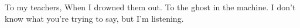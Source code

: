 \noindent To my teachers,
\newline When I drowned them out.
\newline
\newline
\noindent To the ghost in the machine.
\newline
I don't know what you're trying to say, but I'm listening.
